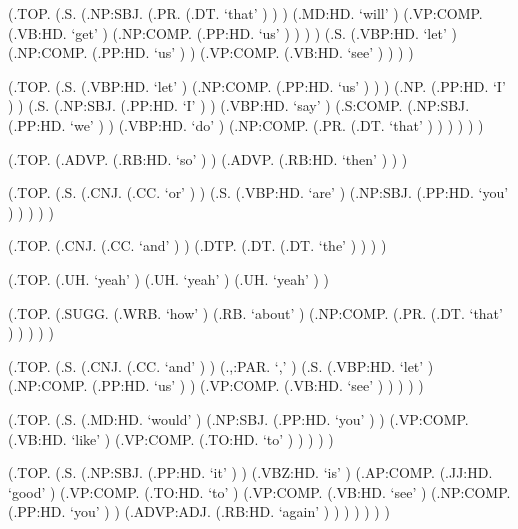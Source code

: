 \documentclass[10pt]{article}
\begin{document}
\begin{parsetree}  (.TOP. (.S. (.NP:SBJ. (.PR. (.DT. `that' ) ) ) (.MD:HD. `will' ) (.VP:COMP. (.VB:HD. `get' ) (.NP:COMP. (.PP:HD. `us' ) ) ) ) (.S. (.VBP:HD. `let' ) (.NP:COMP. (.PP:HD. `us' ) ) (.VP:COMP. (.VB:HD. `see' ) ) ) ) \end{parsetree}

\begin{parsetree}  (.TOP. (.S. (.VBP:HD. `let' ) (.NP:COMP. (.PP:HD. `us' ) ) ) (.NP. (.PP:HD. `I' ) ) (.S. (.NP:SBJ. (.PP:HD. `I' ) ) (.VBP:HD. `say' ) (.S:COMP. (.NP:SBJ. (.PP:HD. `we' ) ) (.VBP:HD. `do' ) (.NP:COMP. (.PR. (.DT. `that' ) ) ) ) ) ) \end{parsetree}

\begin{parsetree}  (.TOP. (.ADVP. (.RB:HD. `so' ) ) (.ADVP. (.RB:HD. `then' ) ) ) \end{parsetree}

\begin{parsetree}  (.TOP. (.S. (.CNJ. (.CC. `or' ) ) (.S. (.VBP:HD. `are' ) (.NP:SBJ. (.PP:HD. `you' ) ) ) ) ) \end{parsetree}

\begin{parsetree}  (.TOP. (.CNJ. (.CC. `and' ) ) (.DTP. (.DT. (.DT. `the' ) ) ) ) \end{parsetree}

\begin{parsetree}  (.TOP. (.UH. `yeah' ) (.UH. `yeah' ) (.UH. `yeah' ) ) \end{parsetree}

\begin{parsetree}  (.TOP. (.SUGG. (.WRB. `how' ) (.RB. `about' ) (.NP:COMP. (.PR. (.DT. `that' ) ) ) ) ) \end{parsetree}

\begin{parsetree}  (.TOP. (.S. (.CNJ. (.CC. `and' ) ) (.,:PAR. `,' ) (.S. (.VBP:HD. `let' ) (.NP:COMP. (.PP:HD. `us' ) ) (.VP:COMP. (.VB:HD. `see' ) ) ) ) ) \end{parsetree}

\begin{parsetree}  (.TOP. (.S. (.MD:HD. `would' ) (.NP:SBJ. (.PP:HD. `you' ) ) (.VP:COMP. (.VB:HD. `like' ) (.VP:COMP. (.TO:HD. `to' ) ) ) ) ) \end{parsetree}

\begin{parsetree}  (.TOP. (.S. (.NP:SBJ. (.PP:HD. `it' ) ) (.VBZ:HD. `is' ) (.AP:COMP. (.JJ:HD. `good' ) (.VP:COMP. (.TO:HD. `to' ) (.VP:COMP. (.VB:HD. `see' ) (.NP:COMP. (.PP:HD. `you' ) ) (.ADVP:ADJ. (.RB:HD. `again' ) ) ) ) ) ) ) \end{parsetree}
\end{document}
